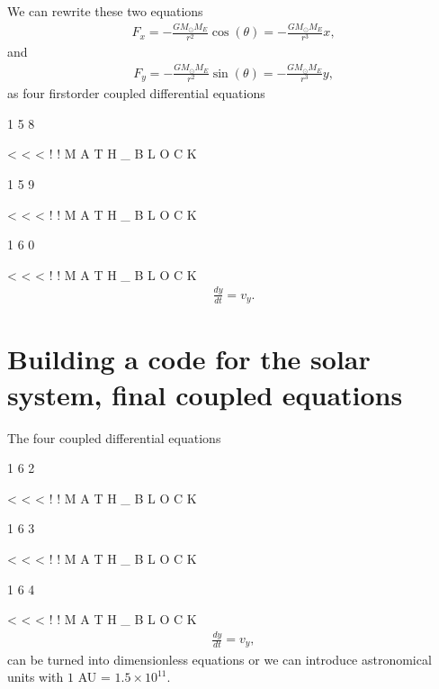 \documentclass[letterpaper,10pt,english]{sphinxmanual}
\begin{document}
We can rewrite these two equations
\begin{equation*}
\begin{split}
F_{x}=-\frac{GM_{\odot}M_E}{r^2}\cos{(\theta)}=-\frac{GM_{\odot}M_E}{r^3}x,
\end{split}
\end{equation*}
and
\begin{equation*}
\begin{split}
F_{y}=-\frac{GM_{\odot}M_E}{r^2}\sin{(\theta)}=-\frac{GM_{\odot}M_E}{r^3}y,
\end{split}
\end{equation*}
as four first\sphinxhyphen{}order coupled differential equations

1
5
8

\textless{}
\textless{}
\textless{}
!
!
M
A
T
H
\_
B
L
O
C
K

1
5
9

\textless{}
\textless{}
\textless{}
!
!
M
A
T
H
\_
B
L
O
C
K

1
6
0

\textless{}
\textless{}
\textless{}
!
!
M
A
T
H
\_
B
L
O
C
K
\begin{equation*}
\begin{split}
\frac{dy}{dt}=v_y.
\end{split}
\end{equation*}

\section{Building a code for the solar system, final coupled equations}
\label{\detokenize{chapter1:building-a-code-for-the-solar-system-final-coupled-equations}}
The four coupled differential equations

1
6
2

\textless{}
\textless{}
\textless{}
!
!
M
A
T
H
\_
B
L
O
C
K

1
6
3

\textless{}
\textless{}
\textless{}
!
!
M
A
T
H
\_
B
L
O
C
K

1
6
4

\textless{}
\textless{}
\textless{}
!
!
M
A
T
H
\_
B
L
O
C
K
\begin{equation*}
\begin{split}
\frac{dy}{dt}=v_y,
\end{split}
\end{equation*}
can be turned into dimensionless equations or we can introduce astronomical units with \(1\) AU = \(1.5\times 10^{11}\).
\end{document}
